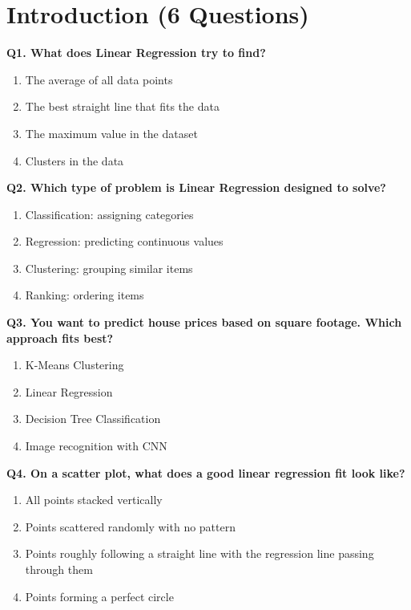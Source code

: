 \documentclass[12pt, a4paper]{article}
\newcommand{\question}[1]{\vspace{0.6em}\noindent\textbf{#1}}
\begin{document}
\tableofcontents
\newpage


\section{Introduction (6 Questions)}

\question{Q1. What does Linear Regression try to find?}
\begin{enumerate}[label=\alph*)]
    \item The average of all data points
    \item The best straight line that fits the data
    \item The maximum value in the dataset
    \item Clusters in the data
\end{enumerate}

\question{Q2. Which type of problem is Linear Regression designed to solve?}
\begin{enumerate}[label=\alph*)]
    \item Classification: assigning categories
    \item Regression: predicting continuous values
    \item Clustering: grouping similar items
    \item Ranking: ordering items
\end{enumerate}

\question{Q3. You want to predict house prices based on square footage. Which approach fits best?}
\begin{enumerate}[label=\alph*)]
    \item K-Means Clustering
    \item Linear Regression
    \item Decision Tree Classification
    \item Image recognition with CNN
\end{enumerate}

\question{Q4. On a scatter plot, what does a good linear regression fit look like?}
\begin{enumerate}[label=\alph*)]
    \item All points stacked vertically
    \item Points scattered randomly with no pattern
    \item Points roughly following a straight line with the regression line passing through them
    \item Points forming a perfect circle
\end{enumerate}
\end{document}
